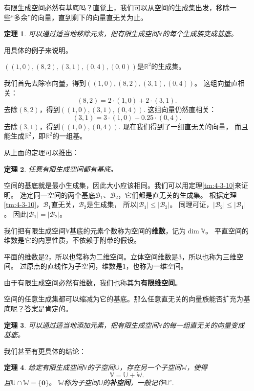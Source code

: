 \documentclass[12pt,UTF8]{ctexbook}
\newtheorem{tm}{定理}[section]
\begin{document}
有限生成空间必然有基底吗？直觉上，我们可以从空间的生成集出发，移除一些“多余”的向量，直到剩下的向量直无关为止。

\begin{tm}\label{tm:4-3-40}
    可以通过适当地移除元素，把有限生成空间$\mathbb{V}$的每个生成族变成基底。
\end{tm}

用具体的例子来说明。

$\left((1,0),(8,2),(3,1),(0,4),(0,0)\right)$是$\mathbb{R}^2$的生成集。

我们首先去除零向量，得到$\left((1,0),(8,2),(3,1),(0,4)\right)$。 
这组向量直相关：
$$ (8,2) = 2\cdot(1,0) + 2\cdot(3,1).$$
去除$(8,2)$，得到$\left((1,0),(3,1),(0,4)\right).$ 这组向量仍然直相关：
$$ (3,1) = 3\cdot(1,0) + 0.25\cdot(0,4).$$
去除$(3,1)$，得到$\left((1,0),(0,4)\right).$ 现在我们得到了一组直无关的向量，
而且能生成$\mathbb{R}^2$，即$\mathbb{R}^2$的一组基。

从上面的定理可以推出：
\begin{tm}\label{tm:4-3-50}
    任意有限生成空间都有基底。
\end{tm}

空间的基底就是最小生成集，因此大小应该相同。我们可以用定理\ref{tm:4-3-10}来证明。
选定同一空间的两个基底$\mathcal{B}_1$、$\mathcal{B}_2$，它们都是直无关的生成集。
根据定理\ref{tm:4-3-10}，$\mathcal{B}_1$直无关，$\mathcal{B}_2$是生成集，
所以$|\mathcal{B}_1| \leqslant |\mathcal{B}_2|$。
同理可证，$|\mathcal{B}_2| \leqslant |\mathcal{B}_1|$。
因此$|\mathcal{B}_1| = |\mathcal{B}_2|$。

我们把有限生成空间$\mathbb{V}$基底的元素个数称为空间的\textbf{维数}，记为$\dim \mathbb{V}$。
平直空间的维数是它的内禀性质，不依赖于附带的假设。

平面的维数是$2$，所以也常称为二维空间。立体空间维数是$3$，所以也称为三维空间。
过原点的直线作为子空间，维数是$1$，也称为一维空间。

由于有限生成空间必然有维数，我们也称其为\textbf{有限维空间}。

空间的任意生成集都可以缩减为它的基底。那么任意直无关的向量族能否扩充为基底呢？答案是肯定的。
\begin{tm}\label{tm:4-3-60}
    可以通过适当地添加元素，把有限生成空间$\mathbb{V}$的每一组直无关的向量变成基底。
\end{tm}

我们甚至有更具体的结论：
\begin{tm}\label{tm:4-3-70}
    给定有限生成空间$\mathbb{V}$的子空间$\mathbb{U}$，存在另一个子空间$\mathbb{W}$，使得
    $$ \mathbb{V} = \mathbb{U} + \mathbb{W}.$$
    且$\mathbb{U} \cap \mathbb{W} = \{\mathbf{0}\}$。
    $\mathbb{W}$称为子空间$\mathbb{U}$的\textbf{补空间}，一般记作$\mathbb{U}^c.$
\end{tm}
\end{document}
